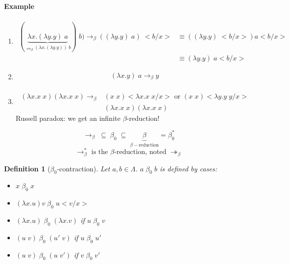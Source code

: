 \documentclass{article}
\newtheorem{defi}{Definition}
\begin{document}
\paragraph{Example}
\begin{enumerate}
\item \begin{align*}
(\underbrace{\lambda x. (\lambda y.y)\; a}_{\nrightarrow_\beta (\lambda x.(\lambda y.y))\; b})\; b) \to_\beta ((\lambda y.y)\; a)\;<b/x> & \equiv ((\lambda y.y)\;<b/x>)a<b/x>\\
& \equiv (\lambda y.y)\; a<b/x>
\end{align*}

\item \begin{align*}
(\lambda x.y)\; a \to_\beta y\\
\end{align*}

\item \begin{align*}
(\lambda x.x\; x)(\lambda x.x \;x) \to_\beta & (x\; x)<\lambda x.x \; x \big/ x> \text{ or } (x\; x)<\lambda y.y \; y\big /x>\\
& (\lambda x. x\;x)(\lambda x.x\; x)
\end{align*}
Russell paradox: we get an infinite $\beta$-reduction!
\end{enumerate}

\[\to_\beta \; \subseteq \; \beta_0 \; \subseteq \; \underbrace{\beta}_{\beta-\text{reduction}} = \beta_0^* \]
\[\to_\beta^* \text{ is the $\beta$-reduction, noted } \twoheadrightarrow_\beta \]

\begin{defi}[$\beta_0$-contraction]
Let $a,b\in \Lambda$. $a\; \beta_0 \; b$ is defined by cases:
\begin{itemize}
\item $x\; \beta_0 \; x$
\item $(\lambda x.u)v\; \beta_0 \; u<v/x>$
\item $(\lambda x.u)\; \beta_0 \; (\lambda x.v)$ if $u\; \beta_0 \; v$
\item $(u\; v)\; \beta_0 \; (u'\; v)$ if $u\;\beta_0\;u'$
\item $(u\; v)\; \beta_0 \; (u\;v')$ if $v\; \beta_0 \; v'$
\end{itemize}
\end{defi}
\end{document}
